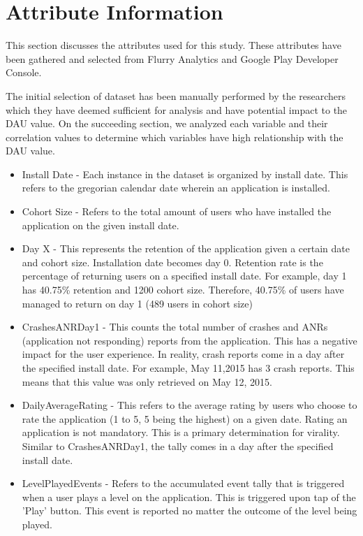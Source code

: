 \section{Attribute Information}
This section discusses the attributes used for this study. These attributes have been gathered and selected from Flurry Analytics and Google Play Developer Console. 

The initial selection of dataset has been manually performed by the researchers which they have deemed sufficient for analysis and have potential impact to the DAU value. On the succeeding section, we analyzed each variable and their correlation values to determine which variables have high relationship with the DAU value.

\begin{itemize}
\item Install Date - Each instance in the dataset is organized by install date. This refers to the gregorian calendar date wherein an application is installed.
\item Cohort Size - Refers to the total amount of users who have installed the application on the given install date.
\item Day X - This represents the retention of the application given a certain date and cohort size. Installation date becomes day 0. Retention rate is the percentage of returning users on a specified install date. For example, day 1 has 40.75\% retention and 1200 cohort size. Therefore, 40.75\% of users have managed to return on day 1 (489 users in cohort size)
\item CrashesANRDay1 - This counts the total number of crashes and ANRs (application not responding) reports from the application. This has a negative impact for the user experience. In reality, crash reports come in a day after the specified install date. For example, May 11,2015 has 3 crash reports. This means that this value was only retrieved on May 12, 2015.
\item DailyAverageRating - This refers to the average rating by users who choose to rate the application (1 to 5, 5 being the highest) on a given date. Rating an application is not mandatory. This is a primary determination for virality. Similar to CrashesANRDay1, the tally comes in a day after the specified install date.
\item LevelPlayedEvents - Refers to the accumulated event tally that is triggered when a user plays a level on the application. This is triggered upon tap of the 'Play' button. This event is reported no matter the outcome of the level being played.

\end{itemize}
